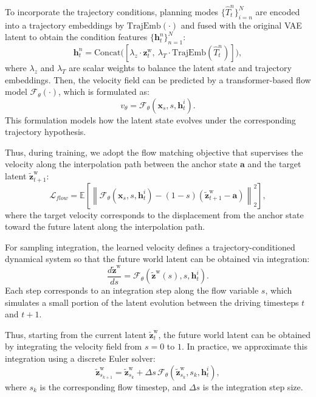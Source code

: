 To incorporate the trajectory conditions, planning modes $\{\hat{T}_t^n\}_{i=n}^N$ are encoded into a trajectory embeddings by $\mathrm{TrajEmb}(\cdot)$ and fused with the original VAE latent to obtain the condition features $\{\mathbf{h}_t^n\}_{n=1}^{N}$:
\begin{equation}
\mathbf{h}_t^n = \mathrm{Concat}\big([\lambda_z\cdot \mathbf{z}^{\text{w}}_t,\ \lambda_T \cdot\mathrm{TrajEmb}(\hat{T}_t^n)]\big),
\end{equation}
where $\lambda_z$ and $\lambda_T$ are scalar weights to balance the latent state and trajectory embeddings.
Then, the velocity field can be predicted by a transformer-based flow model $\mathcal{F}_\theta(\cdot)$, which is formulated as:
\begin{equation}
v_\theta = \mathcal{F}_\theta(\mathbf{x}_s, s, \mathbf{h}_t^i).
\end{equation}
This formulation models how the latent state evolves under the corresponding trajectory hypothesis.

Thus, during training, we adopt the flow matching objective that supervises the velocity along the interpolation path between the anchor state $\mathbf{a}$ and the target latent $\tilde{\mathbf{z}}_{t+1}^{\text{w}}$:
\begin{equation}
\mathcal{L}_{flow} =
\mathbb{E}
\left[
\left\|
\mathcal{F}_\theta(\mathbf{x}_s, s, \mathbf{h}_t^{i})
-
(1-s)(\tilde{\mathbf{z}}_{t+1}^{\text{w}}-\mathbf{a})
\right\|_2^2
\right],
\label{eq_loss}
\end{equation}
where the target velocity corresponds to the displacement from the anchor state toward the future latent along the interpolation path.

\noindent For sampling integration, the learned velocity defines a trajectory-conditioned dynamical system so that the future world latent can be obtained via integration:
\begin{equation}
\frac{d\tilde{\mathbf{z}}^{\text{w}}}{ds}
=
\mathcal{F}_\theta(\tilde{\mathbf{z}}^{\text{w}}(s), s, \mathbf{h}_t^{i}).
\end{equation}
Each step corresponds to an integration step along the flow variable $s$, which simulates a small portion of the latent evolution between the driving timesteps $t$ and $t+1$.

Thus, starting from the current latent $\tilde{\mathbf{z}}_t^{\text{w}}$, the future world latent can be obtained by integrating the velocity field from $s=0$ to $1$. 
In practice, we approximate this integration using a discrete Euler solver:
\begin{equation}
\tilde{\mathbf{z}}_{s_{k+1}}^{\text{w}}
=
\tilde{\mathbf{z}}_{s_k}^{\text{w}}
+
\Delta s \,
\mathcal{F}_\theta(\tilde{\mathbf{z}}_{s_k}^{\text{w}}, s_k, \mathbf{h}_t^{i}),
\end{equation}
where $s_k$ is the corresponding flow timestep, and $\Delta s$ is the integration step size.


